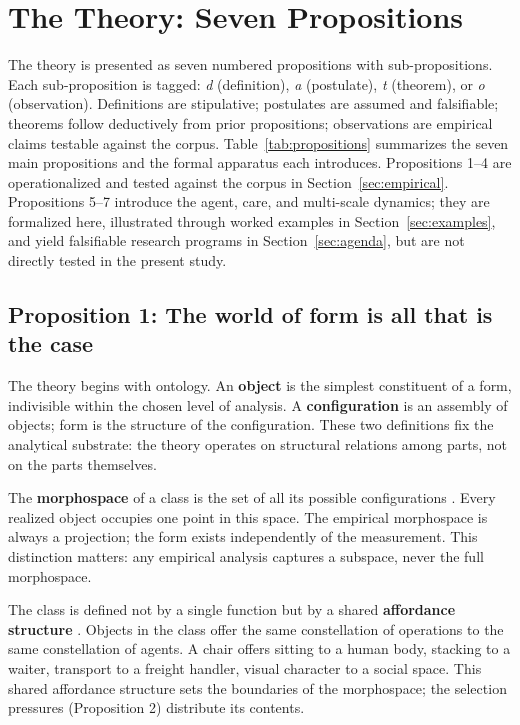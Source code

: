\section{The Theory: Seven Propositions}
\label{sec:theory}

The theory is presented as seven numbered propositions with sub-propositions. Each sub-proposition is tagged: \textit{d} (definition), \textit{a} (postulate), \textit{t} (theorem), or \textit{o} (observation). Definitions are stipulative; postulates are assumed and falsifiable; theorems follow deductively from prior propositions; observations are empirical claims testable against the corpus. Table~\ref{tab:propositions} summarizes the seven main propositions and the formal apparatus each introduces. Propositions 1--4 are operationalized and tested against the corpus in Section~\ref{sec:empirical}. Propositions 5--7 introduce the agent, care, and multi-scale dynamics; they are formalized here, illustrated through worked examples in Section~\ref{sec:examples}, and yield falsifiable research programs in Section~\ref{sec:agenda}, but are not directly tested in the present study.

\subsection{Proposition 1: The world of form is all that is the case}
\label{sec:prop1}

The theory begins with ontology. An \textbf{object} is the simplest constituent of a form, indivisible within the chosen level of analysis. A \textbf{configuration} is an assembly of objects; form is the structure of the configuration. These two definitions fix the analytical substrate: the theory operates on structural relations among parts, not on the parts themselves.

The \textbf{morphospace} of a class is the set of all its possible configurations \parencite{Raup1966, Mitteroecker2009}. Every realized object occupies one point in this space. The empirical morphospace is always a projection; the form exists independently of the measurement. This distinction matters: any empirical analysis captures a subspace, never the full morphospace.

The class is defined not by a single function but by a shared \textbf{affordance structure} \parencite{Gibson1979}. Objects in the class offer the same constellation of operations to the same constellation of agents. A chair offers sitting to a human body, stacking to a waiter, transport to a freight handler, visual character to a social space. This shared affordance structure sets the boundaries of the morphospace; the selection pressures (Proposition 2) distribute its contents.

